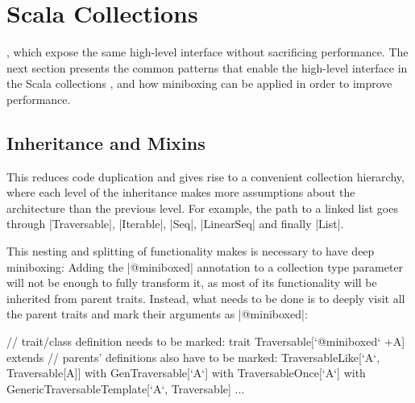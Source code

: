 \section{Scala Collections}


, which expose the same high-level interface without sacrificing performance. The next section presents the common patterns that enable the high-level interface in the Scala collections \cite{collections-arch}, and how miniboxing can be applied in order to improve performance.


\subsection{Inheritance and Mixins}

 This reduces code duplication and gives rise to a convenient collection hierarchy, where each level of the inheritance makes more assumptions about the architecture than the previous level. For example, the path to a linked list goes through |Traversable|, |Iterable|, |Seq|, |LinearSeq| and finally |List|. %

This nesting and splitting of functionality makes is necessary to have deep miniboxing: Adding the |@miniboxed| annotation to a collection type parameter will not be enough to fully transform it, as most of its functionality will be inherited from parent traits. Instead, what needs to be done is to deeply visit all the parent traits and mark their arguments as |@miniboxed|:

\begin{lstlisting-nobreak}
 // trait/class definition needs to be marked:
 trait Traversable[`@miniboxed` +A] extends
 // parents' definitions also have to be marked:
       TraversableLike[`A`, Traversable[A]]
       with GenTraversable[`A`]
       with TraversableOnce[`A`]
       with GenericTraversableTemplate[`A`, Traversable] { ... }
\end{lstlisting-nobreak}

